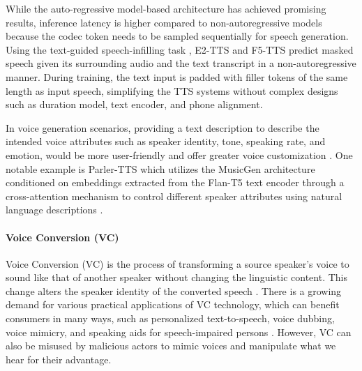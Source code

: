 While the auto-regressive model-based architecture has achieved promising results, inference latency is higher compared to non-autoregressive models because the codec token needs to be sampled sequentially for speech generation. Using the text-guided speech-infilling task \cite{le2023voicebox},  E2-TTS \cite{e2tts} and F5-TTS \cite{f5tts} predict masked speech given its surrounding audio and the text transcript in a non-autoregressive manner. During training, the text input is padded with filler tokens of the same length as input speech, simplifying the TTS systems without complex designs such as duration model, text encoder, and phone alignment.  

In voice generation scenarios, providing a text description to describe the intended voice attributes such as speaker identity, tone, speaking rate, and emotion, would be more user-friendly and offer greater voice customization \cite{guo2023, instruct_tts, prompt_tts2}. One notable example is Parler-TTS \cite{lacombe-etal-2024-parler-tts} which utilizes the MusicGen \textcolor{red}{\cite{copet2024simple}} architecture conditioned on embeddings extracted from the Flan-T5 text encoder through a cross-attention mechanism to control different speaker attributes using natural language descriptions \cite{lyth2024natural}.

\paragraph{Voice Conversion (VC)}

Voice Conversion (VC) is the process of transforming a source speaker's voice to sound like that of another speaker without changing the linguistic content. This change alters the speaker identity of the converted speech \cite{hamid2017}. There is a growing demand for various practical applications of VC technology, which can benefit consumers in many ways, such as personalized text-to-speech, voice dubbing, voice mimicry, and speaking aids for speech-impaired persons \cite{kain2007, biadsy2019}. However, VC can also be misused by malicious actors to mimic voices and manipulate what we hear for their advantage.

